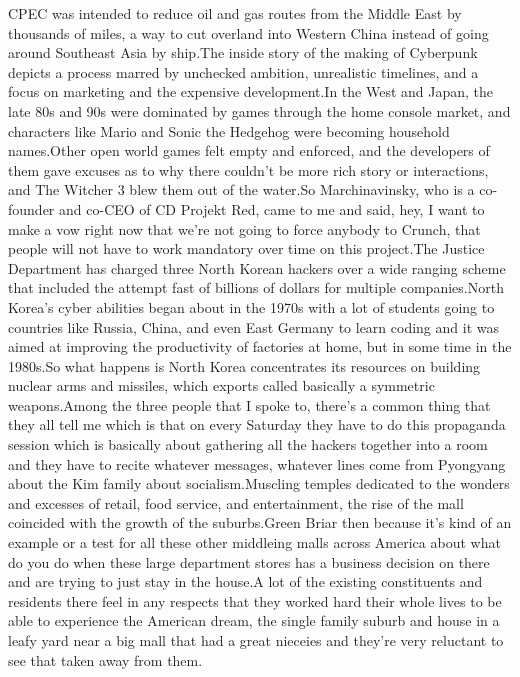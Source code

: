 \documentclass{article}%
\begin{document}
CPEC was intended to reduce oil and gas routes from the Middle East by thousands of miles, a way to cut overland into Western China instead of going around Southeast Asia by ship.The inside story of the making of Cyberpunk depicts a process marred by unchecked ambition, unrealistic timelines, and a focus on marketing and the expensive development.In the West and Japan, the late 80s and 90s were dominated by games through the home console market, and characters like Mario and Sonic the Hedgehog were becoming household names.Other open world games felt empty and enforced, and the developers of them gave excuses as to why there couldn't be more rich story or interactions, and The Witcher 3 blew them out of the water.So Marchinavinsky, who is a co{-}founder and co{-}CEO of CD Projekt Red, came to me and said, hey, I want to make a vow right now that we're not going to force anybody to Crunch, that people will not have to work mandatory over time on this project.The Justice Department has charged three North Korean hackers over a wide ranging scheme that included the attempt fast of billions of dollars for multiple companies.North Korea's cyber abilities began about in the 1970s with a lot of students going to countries like Russia, China, and even East Germany to learn coding and it was aimed at improving the productivity of factories at home, but in some time in the 1980s.So what happens is North Korea concentrates its resources on building nuclear arms and missiles, which exports called basically a symmetric weapons.Among the three people that I spoke to, there's a common thing that they all tell me which is that on every Saturday they have to do this propaganda session which is basically about gathering all the hackers together into a room and they have to recite whatever messages, whatever lines come from Pyongyang about the Kim family about socialism.Muscling temples dedicated to the wonders and excesses of retail, food service, and entertainment, the rise of the mall coincided with the growth of the suburbs.Green Briar then because it's kind of an example or a test for all these other middleing malls across America about what do you do when these large department stores has a business decision on there and are trying to just stay in the house.A lot of the existing constituents and residents there feel in any respects that they worked hard their whole lives to be able to experience the American dream, the single family suburb and house in a leafy yard near a big mall that had a great nieceies and they're very reluctant to see that taken away from them.%
\end{document}
